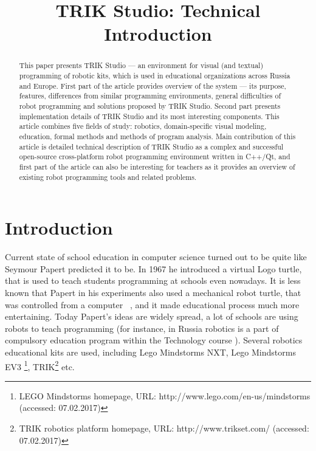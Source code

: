 \documentclass[conference]{IEEEtran}
\begin{document}
\title{TRIK Studio: Technical Introduction}
\date{}%

\author{
\and
}

\maketitle

\begin{abstract}
This paper presents TRIK Studio --- an environment for visual (and textual) programming of robotic kits, which is used in educational organizations across Russia and Europe. First part of the article provides overview of the system --- its purpose, features, differences from similar programming environments, general difficulties of robot programming and solutions proposed by TRIK Studio. Second part presents implementation details of TRIK Studio and its most interesting components. This article combines five fields of study: robotics, domain-specific visual modeling, education, formal methods and methods of program analysis. Main contribution of this article is detailed technical description of TRIK Studio as a complex and successful open-source cross-platform robot programming environment written in C++/Qt, and first part of the article can also be interesting for teachers as it provides an overview of existing robot programming tools and related problems.
\end{abstract}

\section{Introduction}
\label{chapter:intro}
Current state of school education in computer science turned out to be quite like Seymour Papert predicted it to be. In 1967 he introduced a virtual Logo turtle, that is used to teach students programming at schools even nowadays. It is less known that Papert in his experiments also used a mechanical robot turtle, that was controlled from a computer ~\cite{papert1980mindstorms}, and it made educational process much more entertaining. Today Papert's ideas are widely spread, a lot of schools are using robots to teach programming (for instance, in Russia robotics is a part of compulsory education program within the Technology course \cite{черёмухин2014внедрение,лучин2016внедрение}). Several robotics educational kits are used, including Lego Mindstorms NXT, Lego Mindstorms EV3 \footnote{LEGO Mindstorms homepage, URL: http://www.lego.com/en-us/mindstorms (accessed: 07.02.2017)}, 
TRIK\footnote{TRIK robotics platform homepage, URL: http://www.trikset.com/ (accessed: 07.02.2017)} etc.
\end{document}
